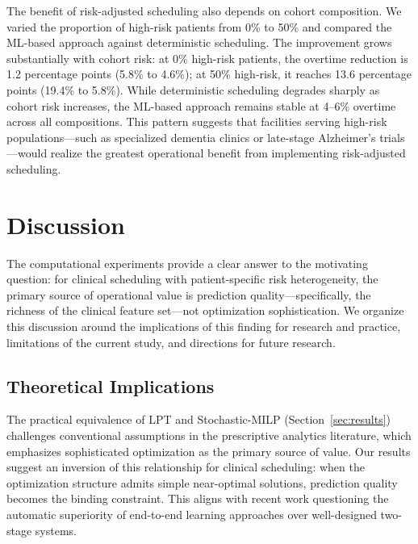 \documentclass[msom,blindrev]{informs3}
\begin{document}
The benefit of risk-adjusted scheduling also depends on cohort composition. We varied the proportion of high-risk patients from 0\% to 50\% and compared the ML-based approach against deterministic scheduling. The improvement grows substantially with cohort risk: at 0\% high-risk patients, the overtime reduction is 1.2 percentage points (5.8\% to 4.6\%); at 50\% high-risk, it reaches 13.6 percentage points (19.4\% to 5.8\%). While deterministic scheduling degrades sharply as cohort risk increases, the ML-based approach remains stable at 4--6\% overtime across all compositions. This pattern suggests that facilities serving high-risk populations---such as specialized dementia clinics or late-stage Alzheimer's trials---would realize the greatest operational benefit from implementing risk-adjusted scheduling.



\section{Discussion}
\label{sec:discussion}

The computational experiments provide a clear answer to the motivating question: for clinical scheduling with patient-specific risk heterogeneity, the primary source of operational value is prediction quality---specifically, the richness of the clinical feature set---not optimization sophistication. We organize this discussion around the implications of this finding for research and practice, limitations of the current study, and directions for future research.

\subsection{Theoretical Implications}

The practical equivalence of LPT and Stochastic-MILP (Section~\ref{sec:results}) challenges conventional assumptions in the prescriptive analytics literature, which emphasizes sophisticated optimization as the primary source of value. Our results suggest an inversion of this relationship for clinical scheduling: when the optimization structure admits simple near-optimal solutions, prediction quality becomes the binding constraint. This aligns with recent work questioning the automatic superiority of end-to-end learning approaches over well-designed two-stage systems.
\end{document}
